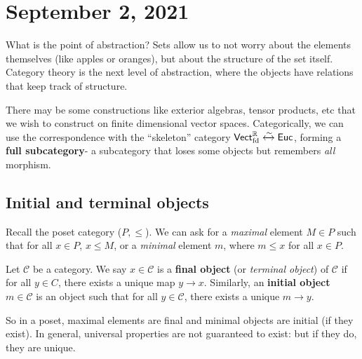 \section{September 2, 2021} 
What is the point of abstraction? Sets allow us to not worry about the elements themselves (like apples or oranges), but about the structure of the set itself. Category theory is the next level of abstraction, where the objects have relations that keep track of structure.

There may be some constructions like exterior algebras, tensor products, etc that we wish to construct on finite dimensional vector spaces. Categorically, we can use the correspondence with the ``skeleton'' category $\mathsf{Vect} _{\mathrm{fd}}^{\mathbb{R}}\xleftrightarrow{\sim} \mathsf{Euc} $, forming a \textbf{full subcategory}- a subcategory that loses some objects but remembers \emph{all} morphism.

\subsection{Initial and terminal objects}
Recall the poset category ($P, \leq$). We can ask for a \emph{maximal} element $M \in P$ such that for all $x \in P$, $x \leq M$, or a \emph{minimal} element $m$, where $m\leq x$ for all $x \in P$.
\begin{definition}[]
    Let $\mathcal{C} $ be a category. We say $x \in \mathcal{C} $ is a \textbf{final object} (or \emph{terminal object}) of $\mathcal{C} $ if for all $y \in C$, there exists a unique map $y \to x$. Similarly, an \textbf{initial object} $m \in \mathcal{C} $ is an object such that for all $y \in \mathcal{C} $, there exists a unique $m \to y$.
\end{definition}
So in a poset, maximal elements are final and minimal objects are initial (if they exist). In general, universal properties are not guaranteed to exist: but if they do, they are unique.

